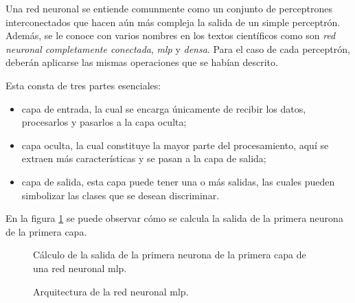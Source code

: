 \par Una red neuronal se entiende comunmente como un conjunto de perceptrones interconectados que hacen aún más compleja la salida de un simple perceptrón. Además, se le conoce con varios nombres en los textos científicos como son \textit{red neuronal completamente conectada}, \textit{\gls{mlp}} y \textit{densa}. Para el caso de cada perceptrón, deberán aplicarse las mismas operaciones que se habían descrito. 
\par Esta consta de tres partes esenciales: 
	\begin{itemize}
		\item capa de entrada, la cual se encarga únicamente de recibir los datos, procesarlos y pasarlos a la capa oculta;
		\item capa oculta, la cual constituye la mayor parte del procesamiento, aquí se extraen más características y se pasan a la capa de salida;
		\item  capa de salida, esta capa puede tener una o más salidas, las cuales pueden simbolizar las clases que se desean discriminar.
	\end{itemize}

\par En la figura \ref{fig:redneuronal1} se puede observar cómo se calcula la salida de la primera neurona de la primera capa.

\begin{figure}[h]
	\centering
	
	\caption{Cálculo de la salida de la primera neurona de la primera capa de una red neuronal \gls{mlp}.}
	\label{fig:redneuronal1}
\end{figure}


\begin{figure}[h]
	\centering
	
	\caption{Arquitectura de la red neuronal \gls{mlp}.}
	\label{fig:redneuronal}
\end{figure}


